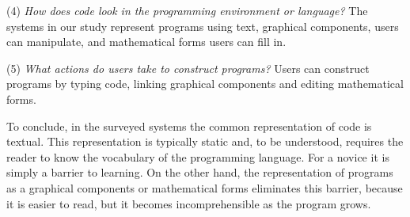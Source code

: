 (4) \textit{How does code look in the programming environment or language?} The systems in our study represent programs using text, graphical components, users can manipulate, and mathematical forms users can fill in.

(5) \textit{What actions do users take to construct programs?} Users can construct programs by typing code, linking graphical components and editing mathematical forms.

To conclude, in the surveyed systems the common representation of code is textual. This representation is typically static and, to be understood, requires the reader to know the vocabulary of the programming language. For a novice it is simply a barrier to learning. On the other hand, the representation of programs as a graphical components or mathematical forms eliminates this barrier, because it is easier to read, but it becomes incomprehensible as the program grows.